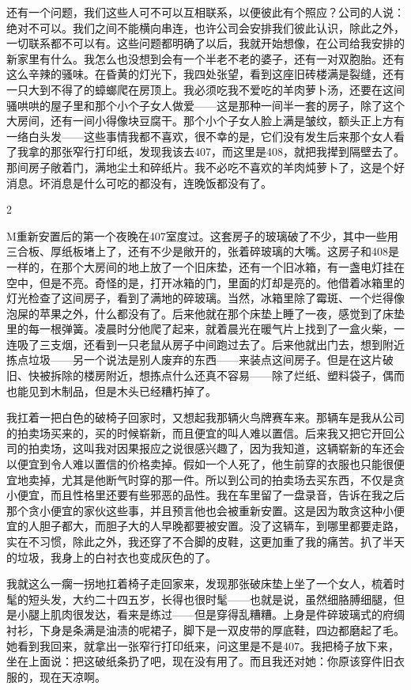 还有一个问题，我们这些人可不可以互相联系，以便彼此有个照应？公司的人说：绝对不可以。我们之间不能横向串连，也许公司会安排我们彼此认识，除此之外，一切联系都不可以有。这些问题都明确了以后，我就开始想像，在公司给我安排的新家里有什么。我怎么也没想到会有一个半老不老的婆子，还有一对双胞胎。还有这么辛辣的骚味。在昏黄的灯光下，我四处张望，看到这座旧砖楼满是裂缝，还有一只大到不得了的蟑螂爬在房顶上。我必须吃我不爱吃的羊肉萝卜汤，还要在这间骚哄哄的屋子里和那个小个子女人做爱——这是那种一间半一套的房子，除了这个大房间，还有一间小得像块豆腐干。那个小个子女人脸上满是皱纹，额头正上方有一络白头发——这些事情我都不喜欢，很不幸的是，它们没有发生后来那个女人看了我拿的那张窄行打印纸，发现我该去407，而这里是408，就把我撵到隔壁去了。那间房子敞着门，满地尘土和碎纸片。我不必吃不喜欢的羊肉炖萝卜了，这是个好消息。坏消息是什么可吃的都没有，连晚饭都没有了。 

2 

M重新安置后的第一个夜晚在407室度过。这套房子的玻璃破了不少，其中一些用三合板、厚纸板堵上了，还有不少是敞开的，张着碎玻璃的大嘴。这房子和408是一样的，在那个大房间的地上放了一个旧床垫，还有一个旧冰箱，有一盏电灯挂在空中，但是不亮。奇怪的是，打开冰箱的门，里面的灯却是亮的。他借着冰箱里的灯光检查了这间房子，看到了满地的碎玻璃。当然，冰箱里除了霉斑、一个烂得像泡屎的苹果之外，什么都没有了。后来他就在那个床垫上睡了一夜，感觉到了床垫里的每一根弹簧。凌晨时分他爬了起来，就着晨光在暖气片上找到了一盒火柴，一连吸了三支烟，还看到一只老鼠从房子中间跑过去了。后来他就出门去，想到附近拣点垃圾——另一个说法是别人废弃的东西——来装点这间房子。但是在这片破旧、快被拆除的楼房附近，想拣点什么还真不容易——除了烂纸、塑料袋子，偶而也能见到木制品，但是木头已经糟朽掉了。 

我扛着一把白色的破椅子回家时，又想起我那辆火鸟牌赛车来。那辆车是我从公司的拍卖场买来的，买的时候崭新，而且便宜的叫人难以置信。后来我又把它开回公司的拍卖场，这叫我对因果报应之说很感兴趣了，因为我知道，这辆崭新的车还会以便宜到令人难以置信的价格卖掉。假如一个人死了，他生前穿的衣服也只能很便宜地卖掉，尤其是他断气时穿的那一件。所以到公司的拍卖场去买东西，不仅是贪小便宜，而且性格里还要有些邪恶的品性。我在车里留了一盘录音，告诉在我之后那个贪小便宜的家伙这些事，并且预言他也会被重新安置。这是因为敢贪这种小便宜的人胆子都大，而胆子大的人早晚都要被安置。没了这辆车，到哪里都要走路，实在不习惯，除此之外，我还穿了不合脚的皮鞋，这更加重了我的痛苦。扒了半天的垃圾，我身上的白衬衣也变成灰色的了。 

我就这么一瘸一拐地扛着椅子走回家来，发现那张破床垫上坐了一个女人，梳着时髦的短头发，大约二十四五岁，长得也很时髦——也就是说，虽然细胳膊细腿，但是小腿上肌肉很发达，看来是练过——但是穿得乱糟糟。上身是件碎玻璃式的府绸衬衫，下身是条满是油渍的呢裙子，脚下是一双皮带的厚底鞋，四边都磨起了毛。她看到我回来，就拿出一张窄行打印纸来，问这里是不是407。我把椅子放下来，坐在上面说：把这破纸条扔了吧，现在没有用了。而且我还对她：你原该穿件旧衣服的，现在天凉啊。 

